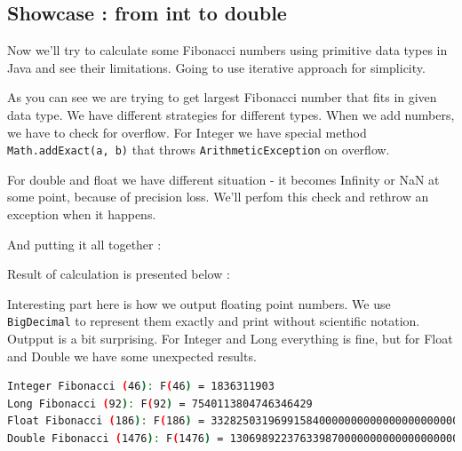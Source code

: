 \documentclass{article}
\begin{document}
\subsection{Showcase : from int to double}
Now we'll try to calculate some Fibonacci numbers using primitive data types in Java and see their limitations. Going to use iterative approach for simplicity.

As you can see we are trying to get largest Fibonacci number that fits in given data type. We have different strategies for different types.
When we add numbers, we have to check for overflow. For Integer we have special method \texttt{Math.addExact(a, b)} that throws \texttt{ArithmeticException} on overflow.

For double and float we have different situation - it becomes Infinity or NaN at some point, because of precision loss. We'll perfom this check and rethrow an exception when it happens.

And putting it all together :

Result of calculation is presented below :

Interesting part here is how we output floating point numbers. We use \texttt{BigDecimal} to represent them exactly and print without scientific notation.
Outpput is a bit surprising. For Integer and Long everything is fine, but for Float and Double we have some unexpected results.
\begin{lstlisting}[language=bash]
Integer Fibonacci (46): F(46) = 1836311903
Long Fibonacci (92): F(92) = 7540113804746346429
Float Fibonacci (186): F(186) = 332825031969915840000000000000000000000
Double Fibonacci (1476): F(1476) = 130698922376339870000000000000000000... // ton of zeros
\end{lstlisting}
\end{document}
